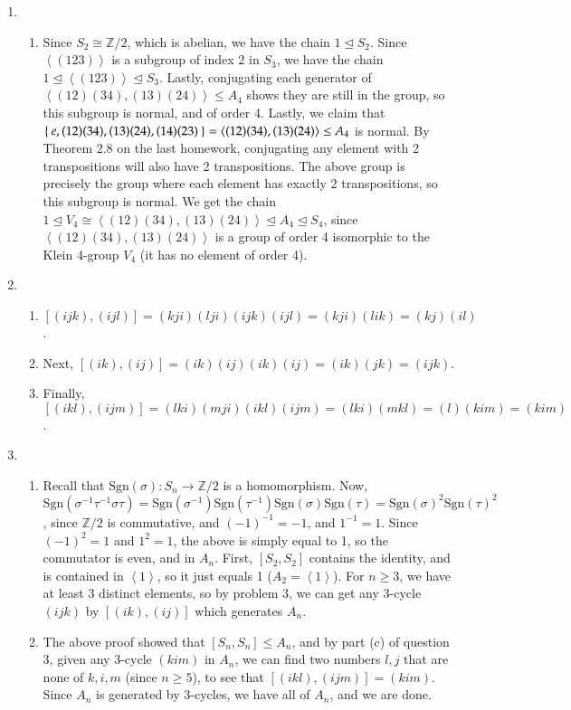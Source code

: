 \documentclass[12pt]{article}
\theoremstyle{definitionstyle}
\def\mbb#1{\mathbb{#1}}
\newcommand{\Z}{\mbb Z}
\newcommand{\gen}[1]{\left\langle #1 \right\rangle}
\newcommand{\nsg}{\trianglelefteq}
\begin{document}
\begin{enumerate}[leftmargin=\labelsep]
		\item
		\begin{enumerate}
			\item Since $S_2 \cong \Z/2$, which is abelian, we have the chain $1 \nsg S_2$. Since $\gen{(123)}$ is a subgroup of index 2 in $S_3$, we have the chain $1 \nsg \gen{(123)} \nsg S_3$. Lastly, conjugating each generator of $\gen{(12)(34), (13)(24)} \leq A_4$ shows they are still in the group, so this subgroup is normal, and of order 4. Lastly, we claim that $\Set{e, (12)(34), (13)(24), (14)(23)} = \gen{(12)(34), (13)(24)} \leq A_4$ is normal. By Theorem 2.8 on the last homework, conjugating any element with 2 transpositions will also have 2 transpositions. The above group is precisely the group where each element has exactly 2 transpositions, so this subgroup is normal. We get the chain $1 \nsg V_4 \cong \gen{(12)(34), (13)(24)} \nsg A_4 \nsg S_4$, since $\gen{(12)(34), (13)(24)}$ is a group of order 4 isomorphic to the Klein 4-group $V_4$ (it has no element of order 4).
		\end{enumerate}
	
		\item 
		\begin{enumerate}
			\item $[(ijk),(ijl)] = (kji)(lji)(ijk)(ijl) = (kji)(lik) = (kj)(il)$. 
			\item Next, $[(ik), (ij)] = (ik)(ij)(ik)(ij) = (ik)(jk) = (ijk)$. 
			\item Finally, $[(ikl), (ijm)] = (lki)(mji)(ikl)(ijm) = (lki)(mkl) = (l)(kim) = (kim)$.
		\end{enumerate}
	
		\item 
		\begin{enumerate}[label=(\arabic*)]
			\item Recall that $\mathrm{Sgn}(\sigma): S_n \to \Z/2$ is a homomorphism. Now, $\mathrm{Sgn}(\sigma^{-1}\tau^{-1}\sigma \tau) = \mathrm{Sgn}(\sigma^{-1})\mathrm{Sgn}(\tau^{-1})\mathrm{Sgn}(\sigma)\mathrm{Sgn}(\tau) = \mathrm{Sgn}(\sigma)^2 \mathrm{Sgn}(\tau)^2$, since $\Z/2$ is commutative, and $(-1)^{-1} = -1$, and $1^{-1} = 1$. Since $(-1)^2 = 1$ and $1^2 = 1$, the above is simply equal to 1, so the commutator is even, and in $A_n$. First, $[S_2,S_2]$ contains the identity, and is contained in $\gen{1}$, so it just equals 1 ($A_2 = \gen{1}$). For $n \geq 3$, we have at least 3 distinct elements, so by problem 3, we can get any 3-cycle $(ijk)$ by $[(ik), (ij)]$ which generates $A_n$. 
			\item The above proof showed that $[S_n, S_n] \leq A_n$, and by part (c) of question 3, given any 3-cycle $(kim)$ in $A_n$, we can find two numbers $l, j$ that are none of $k,i,m$ (since $n \geq 5$), to see that $[(ikl), (ijm)] = (kim)$. Since $A_n$ is generated by 3-cycles, we have all of $A_n$, and we are done.
		\end{enumerate}
	

\end{enumerate}
\end{document}
